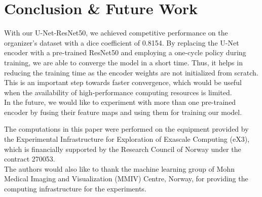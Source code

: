 \documentclass[sigconf]{acmart-me}
\begin{document}
\section{Conclusion \& Future Work}
With our U-Net-ResNet50, we achieved competitive performance on the organizer's dataset with a dice coefficient of 0.8154. By replacing the U-Net encoder with a pre-trained ResNet50 and employing a one-cycle policy during training,  we are able to converge the model in a short time. Thus, it helps in reducing the training time as the encoder weights are not initialized from scratch. This is an important step towards faster convergence, which would be useful when the availability of high-performance computing resources is limited. \\
\indent In the future, we would like to experiment with more than one pre-trained encoder by fusing their feature maps and using them for training our model.  

\begin{acks}
The computations in this paper were performed on the equipment provided by the Experimental Infrastructure for Exploration of Exascale Computing (eX3), which is financially supported by the Research Council of Norway under the contract 270053.\\
\indent The authors would also like to thank the machine learning group of Mohn Medical Imaging and Visualization (MMIV) Centre, Norway, for providing the computing infrastructure for the experiments. \end{acks}

\newpage

\def\bibfont{\small} \balance
 
\end{document}
